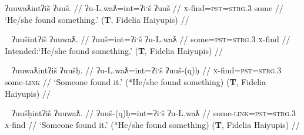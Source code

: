 \ex \label{ex:findsomething}
\begingl
\glpreamble ʔuuwaƛintʔiš ʔuuš. //
\gla ʔu-L.waƛ=int=ʔiˑš ʔuuš //
\glb \textsc{x}-find=\textsc{pst}=\textsc{strg.3} some //
\glft `He/she found something.' (\textbf{T}, Fidelia Haiyupis) //
\endgl
\xe

\ex~ \label{ex:*findsomething}
\begingl
\glpreamble *ʔuušintʔiš ʔuuwaƛ. //
\gla ʔuuš=int=ʔiˑš ʔu-L.waƛ //
\glb some=\textsc{pst}=\textsc{strg.3} \textsc{x}-find //
\glft Intended:`He/she found something.' (\textbf{T}, Fidelia Haiyupis) //
\endgl
\xe

\ex~ \label{ex:findsomeone}
\begingl
\glpreamble ʔuuwaƛintʔiš ʔuušḥ. //
\gla ʔu-L.waƛ=int=ʔiˑš ʔuuš-(q)ḥ //
\glb \textsc{x}-find=\textsc{pst}=\textsc{strg.3} some-\textsc{link} //
\glft `Someone found it.' (*He/she found something) (\textbf{T}, Fidelia Haiyupis) //
\endgl
\xe

\ex~ \label{ex:someonefind}
\begingl
\glpreamble ʔuušḥintʔiš ʔuuwaƛ. //
\gla ʔuuš-(q)ḥ=int=ʔiˑš ʔu-L.waƛ //
\glb some-\textsc{link}=\textsc{pst}=\textsc{strg.3} \textsc{x}-find //
\glft `Someone found it.' (*He/she found something) (\textbf{T}, Fidelia Haiyupis) //
\endgl
\xe


\begin{comment}
\ex \label{ex:findsomething}
\begingl
\glpreamble ʔuuwaʔaƛ ʔuuš.//
\gla ʔu-L.waƛ=!aƛ ʔuuš //
\glb \textsc{x}-find=\textsc{now} some //
\glft `He/she found something.' (*? Someone found it) (\textbf{C}, \textit{tupaat} Julia Lucas) //
\endgl
\xe

\ex~ \label{ex:*findsomething}
\begingl
\glpreamble *ʔuuš ʔuuwaʔaƛ.//
\gla ʔuuš ʔu-L.waƛ=!aƛ //
\glb some \textsc{x}-find=\textsc{now} //
\glft Intended: `He/she found something.' (\textbf{C}, \textit{tupaat} Julia Lucas) //
\endgl
\xe

\ex~ \label{ex:findsomeone}
\begingl
\glpreamble ʔuuwaʔaƛ ʔuušqḥ.//
\gla ʔu-L.waƛ=!aƛ ʔuuš-(q)ḥ //
\glb \textsc{x}-find=\textsc{now} some-\textsc{link} //
\glft `Someone found it.' (*He/she found something) (\textbf{C}, \textit{tupaat} Julia Lucas) //
\endgl
\xe

\ex~ \label{ex:someonefind}
\begingl
\glpreamble ʔuušqḥʔaƛ ʔuuwaƛ.//
\gla ʔuuš-(q)ḥ=!aƛ ʔu-L.waƛ //
\glb some-\textsc{link}=\textsc{now} \textsc{x}-find //
\glft `Someone found it.' (*He/she found something) (\textbf{C}, \textit{tupaat} Julia Lucas) //
\endgl
\xe

\ex \label{ex:someonefind2}
\begingl
\glpreamble ʔuušqḥ ʔuuwaʔaƛ.//
\gla ʔuuš-qḥ ʔu-L.waƛ=!aƛ //
\glb some-\textsc{link} \textsc{x}-find=\textsc{now} //
\glft `Someone found it.' (*He/she found something) //
\endgl
\xe
\end{comment}


